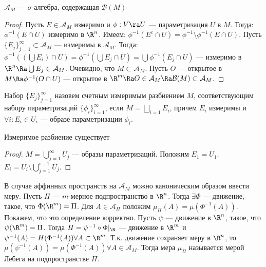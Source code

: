 \begin{lemma}
    \(\mathcal{A}_M\) --- \(\sigma\)-алгебра, содержащая \(\mathcal{B}(M)\)
\end{lemma}
\begin{proof}
    Пусть \(E \in \mathcal{A}_M\) измеримо и \(\phi: V \ra U\) --- параметризация \(U\) в \(M\). Тогда:\(\phi^{-1}(E \cap U)\) измеримо в \(\R^n\). Имеем: \(\phi^{-1}(E^c \cap U) = \phi^{-1} \setminus \phi^{-1}(E \cap U)\). Пусть \(\{E_j\}_{j = 1}^\infty \subset \mathcal{A}_M\) --- измеримы в \(\mathcal{A}_M\). Тогда: \(\phi^{-1}\left( \left( \bigcup E_i \right) \cap U \right) = \phi^{-1}\left( \bigcup E_j \cap U \right) = \bigcup \phi^{-1}(E_j \cap U)\) --- измеримо в \(\R^n \Ra \bigcup E_j \in \mathcal{A}_M\). Очевидно, что \(M \subset \mathcal{A}_M\). Пусть \(O\) --- открытое в \(M \Ra \phi^{-1}(O \cap U)\) --- открытое в \(\R^m \Ra O \in \mathcal{A}_M \Ra \mathcal{B}(M) \subset \mathcal{A}_M\).
\end{proof}

\begin{definition}
    Набор \(\{E_j\}_{j = 1}^\infty\) назовем счетным измеримым разбиением \(M\), соответствующим набору параметризаций \(\{\phi_i\}_{i = 1}^\infty\), если \(M = \bigsqcup_{i = 1}E_i\), причем \(E_i\) измеримы и \(\forall i: E_i \in U_i\) --- образе параметризации \(\phi_i\).
\end{definition}

\begin{note}
    Измеримое разбиение существует
\end{note}
\begin{proof}
    \(M = \bigcup_{j = 1}^\infty U_j\) --- образы параметризаций. Положим \(E_1 = U_1\). \(E_i = U_i \setminus \bigcup_{j = 1}^{i - 1}U_j\).
\end{proof}

В случае аффинных пространств на \(\mathcal{A}_M\) можно каноническим образом ввести меру. Пусть \(\Pi\) --- \(m\)-мерное подпространство в \(\R^n\). Тогда \(\exists \Phi\) --- движение, такое, что \(\Phi(\R^m) = \Pi\). Для \(A \in \mathcal{A}_\Pi\) положим \(\mu_\Pi(A) = \mu(\Phi^{-1}(A))\). Покажем, что это определение корректно. Пусть \(\psi\) --- движение в \(\R^n\), такое, что \(\psi(\R^m) = \Pi\). Тогда \(H = \psi^{-1} \circ \Phi |_\R\) --- движение в \(\R^m\) и \(\psi^{-1}(A) = H(\Phi^{-1}(A)) \forall A \subset \R^m\). Т.к. движение сохраняет меру в \(\R^n\), то \(\mu(\psi^{-1}(A)) = \mu(\Phi^{-1}(A)) \forall A \in \mathcal{A}_M\). Тогда мера \(\mu_\Pi\) называется мерой Лебега на подпространстве \(\Pi\).


